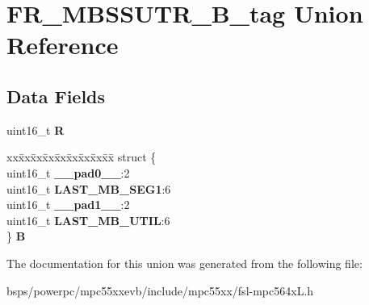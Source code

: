 \hypertarget{unionFR__MBSSUTR__16B__tag}{}\section{F\+R\+\_\+\+M\+B\+S\+S\+U\+T\+R\+\_\+B\+\_\+tag Union Reference}
\label{unionFR__MBSSUTR__16B__tag}
\subsection*{Data Fields}
\begin{DoxyCompactItemize}
\item 
\mbox{\label{unionFR__MBSSUTR__16B__tag_a55079faba9e8ec19f792fcc3f3ccb871}} 
uint16\+\_\+t {\bfseries R}
\item 
\mbox{\label{unionFR__MBSSUTR__16B__tag_a599dcb3eecc18f7df53b2f82b8575bdf}} 
\begin{tabbing}
xx\=xx\=xx\=xx\=xx\=xx\=xx\=xx\=xx\=\kill
struct \{\\
\>uint16\_t {\bfseries \_\_pad0\_\_}:2\\
\>uint16\_t {\bfseries LAST\_MB\_SEG1}:6\\
\>uint16\_t {\bfseries \_\_pad1\_\_}:2\\
\>uint16\_t {\bfseries LAST\_MB\_UTIL}:6\\
\} {\bfseries B}\\

\end{tabbing}\end{DoxyCompactItemize}


The documentation for this union was generated from the following file\+:\begin{DoxyCompactItemize}
\item 
bsps/powerpc/mpc55xxevb/include/mpc55xx/fsl-\/mpc564x\+L.\+h\end{DoxyCompactItemize}
